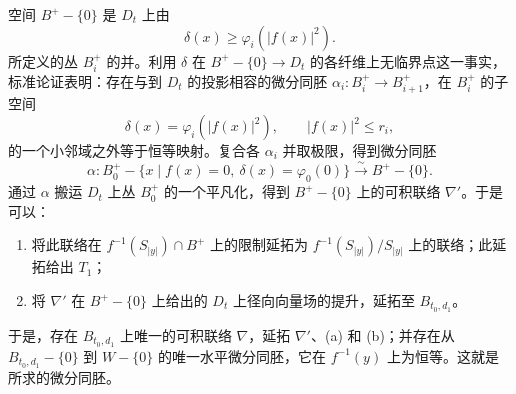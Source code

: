 空间 $B^+-\{0\}$ 是 $D_t$ 上由
\[
\delta(x)\geq\varphi_i(|f(x)|^2).
\]
所定义的丛 $B_i^+$ 的并。利用 $\delta$ 在 $B^+-\{0\}\to D_t$ 的各纤维上无临界点这一事实，标准论证表明：存在与到 $D_t$ 的投影相容的微分同胚 $\alpha_i:B_i^+\to B_{i+1}^+$，在 $B_i^+$ 的子空间
\[
\delta(x)=\varphi_i(|f(x)|^2),
\qquad |f(x)|^2\leq r_i,
\]
的一个小邻域之外等于恒等映射。复合各 $\alpha_i$ 并取极限，得到微分同胚
\[
\alpha:B_0^+-\{x\mid f(x)=0,\ \delta(x)=\varphi_0(0)\}
\xrightarrow{\ \sim\ }B^+-\{0\}.
\]
通过 $\alpha$ 搬运 $D_t$ 上丛 $B_0^+$ 的一个平凡化，得到 $B^+-\{0\}$ 上的可积联络 $\nabla'$。于是可以：

\begin{enumerate}[label=(\alph*)]
\item 将此联络在 $f^{-1}(S_{|y|})\cap B^+$ 上的限制延拓为 $f^{-1}(S_{|y|})/S_{|y|}$ 上的联络；此延拓给出 $T_1$；
\item 将 $\nabla'$ 在 $B^+-\{0\}$ 上给出的 $D_t$ 上径向向量场的提升，延拓至 $B_{t_0,d_1}$。
\end{enumerate}

于是，存在 $B_{t_0,d_1}$ 上唯一的可积联络 $\nabla$，延拓 $\nabla'$、(a) 和 (b)；并存在从 $B_{t_0,d_1}-\{0\}$ 到 $W-\{0\}$ 的唯一水平微分同胚，它在 $f^{-1}(y)$ 上为恒等。这就是所求的微分同胚。


